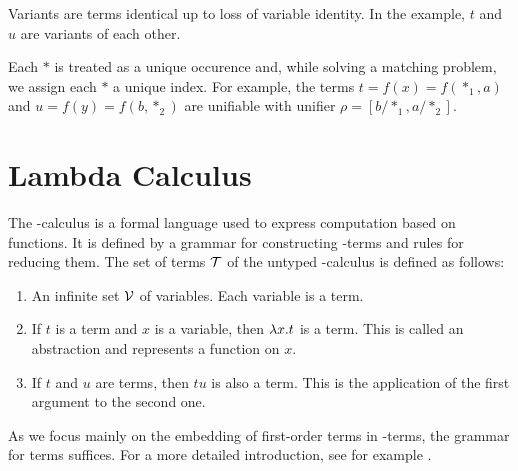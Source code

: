 \begin{defn}
  Variants are terms identical up to loss of variable identity. In the example, $t$ and $u$ are variants of each other.
\end{defn}

Each $*$ is treated as a unique occurence and, while solving a matching problem, we assign each $*$ a unique index. For example, the terms $t = f(x) = f(*_{1}, a)$ and $u = f(y) = f(b, *_{2})$ are unifiable with unifier $\rho = [b/*_{1}, a/*_{2}]$.






\section{Lambda Calculus}
The \lam -calculus is a formal language used to express computation based on functions. It is defined by a grammar for constructing \lam -terms and rules for reducing them. The set of terms $\mathcal{T}$ of the untyped \lam -calculus is defined as follows:
\begin{enumerate}
  \item An infinite set $\mathcal{V}$ of variables. Each variable is a term.
  \item If $t$ is a term and $x$ is a variable, then $\lambda x. t$ is a term. This is called an abstraction and represents a function on $x$.
  \item If $t$ and $u$ are terms, then $t u$ is also a term. This is the application of the first argument to the second one.
\end{enumerate}
As we focus mainly on the embedding of first-order terms in \lam -terms, the grammar for terms suffices. For a more detailed introduction, see for example \cite{loader_notes_nodate}.

